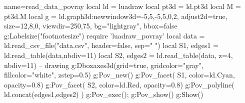 \documentclass[border=5pt]{standalone}%
\begin{document}
\begin{luadraw}{name=read_data_povray}
local ld = luadraw
local pt3d = ld.pt3d
local M = pt3d.M
local g = ld.graph3d:new{window3d={-5,5,-5,5,0,2}, adjust2d=true, 
    size={12,8,0}, viewdir={250,75}, bg="lightgray", bbox=false}
g:Labelsize("footnotesize")
require 'luadraw_povray'
local data = ld.read_csv_file("data.csv", {header=false, sep=" "})
local S1, edges1 = ld.read_table(data,{nbdiv=11})
local S2, edges2 = ld.read_table(data, {z=4, nbdiv=11})
-- drawing
g:Dboxaxes3d({grid=true, gridcolor="gray", fillcolor="white", zstep=0.5})
g:Pov_new()
g:Pov_facet( S1, {color=ld.Cyan, opacity=0.8}) 
g:Pov_facet( S2, {color=ld.Red, opacity=0.8})
g:Pov_polyline( ld.concat(edges1,edges2) )
g:Pov_exec(); g:Pov_show()
g:Show()
\end{luadraw}
\end{document}

